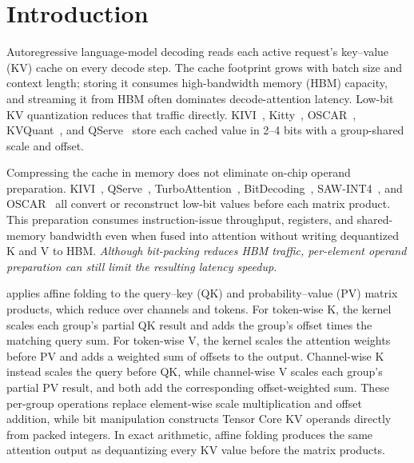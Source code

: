 \section{Introduction}
\label{sec:intro}

Autoregressive language-model decoding reads each active request's key--value (KV) cache on every decode step.
The cache footprint grows with batch size and context length; storing it consumes high-bandwidth memory (HBM) capacity, and streaming it from HBM often dominates decode-attention latency.
Low-bit KV quantization reduces that traffic directly.
KIVI~\cite{liu2024kivi}, Kitty~\cite{xia2025kitty}, OSCAR~\cite{zhou2026oscar}, KVQuant~\cite{hooper2024kvquant}, and QServe~\cite{lin2025qserve} store each cached value in 2--4 bits with a group-shared scale and offset.

Compressing the cache in memory does not eliminate on-chip operand preparation.
KIVI~\cite{liu2024kivi}, QServe~\cite{lin2025qserve}, TurboAttention~\cite{kang2025turboattention}, BitDecoding~\cite{du2026bitdecoding}, SAW-INT4~\cite{jia2026saw}, and OSCAR~\cite{zhou2026oscar} all convert or reconstruct low-bit values before each matrix product.
This preparation consumes instruction-issue throughput, registers, and shared-memory bandwidth even when fused into attention without writing dequantized K and V to HBM.
\emph{Although bit-packing reduces HBM traffic, per-element operand preparation can still limit the resulting latency speedup.}

\sys{} applies affine folding to the query--key (QK) and probability--value (PV) matrix products, which reduce over channels and tokens.
For token-wise K, the kernel scales each group's partial QK result and adds the group's offset times the matching query sum.
For token-wise V, the kernel scales the attention weights before PV and adds a weighted sum of offsets to the output.
Channel-wise K instead scales the query before QK, while channel-wise V scales each group's partial PV result, and both add the corresponding offset-weighted sum.
These per-group operations replace element-wise scale multiplication and offset addition, while bit manipulation constructs Tensor Core KV operands directly from packed integers.
In exact arithmetic, affine folding produces the same attention output as dequantizing every KV value before the matrix products.

